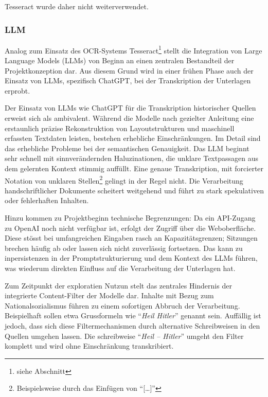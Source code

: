 \documentclass[12pt, a4paper, ngerman, bidi=default]{article}
\begin{document}
Tesseract wurde daher nicht weiterverwendet.

\subsubsection{LLM}\label{subsubsec:LLM_transcript}
Analog zum Einsatz des OCR-Systems Tesseract\footnote{siehe Abschnitt } stellt die Integration von Large Language Models (LLMs) von Beginn an einen zentralen Bestandteil der Projektkonzeption dar.
Aus diesem Grund wird in einer frühen Phase auch der Einsatz von LLMs, spezifisch ChatGPT, bei der Transkription der Unterlagen erprobt.

Der Einsatz von LLMs wie ChatGPT für die Transkription historischer Quellen erweist sich als ambivalent. Während die Modelle nach gezielter 
Anleitung eine erstaunlich präzise Rekonstruktion von Layoutstrukturen und maschinell erfassten Textdaten leisten, bestehen erhebliche Einschränkungen. Im Detail sind das
erhebliche Probleme bei der semantischen Genauigkeit. Das LLM beginnt sehr schnell mit sinnverändernden Haluzinationen, die unklare Textpassagen aus dem gelernten Kontext stimmig auffüllt.
Eine genaue Transkription, mit forcierter Notation von unklaren Stellen\footnote{Beispielsweise durch das Einfügen von \enquote{[\dots]}} gelingt in der Regel nicht. 
Die Verarbeitung handschriftlicher Dokumente scheitert weitgehend und führt zu stark spekulativen oder fehlerhaften Inhalten.

Hinzu kommen zu Projektbeginn technische Begrenzungen: Da ein API-Zugang zu OpenAI noch nicht verfügbar ist, erfolgt der Zugriff 
über die Weboberfläche. Diese stösst bei umfangreichen Eingaben rasch an Kapazitätsgrenzen; 
Sitzungen brechen häufig ab oder lassen sich nicht zuverlässig fortsetzen. Das kann zu inpersistenzen in der Promptstrukturierung und
dem Kontext des LLMs führen, was wiederum direkten Einfluss auf die Verarbeitung der Unterlagen hat.

Zum Zeitpunkt der exploratien Nutzun stelt das zentrales Hindernis der integrierte Content-Filter der Modelle dar. Inhalte mit Bezug zum Nationalsozialismus
führen zu einem sofortigen Abbruch der Verarbeitung. Beispielhaft sollen etwa Grussformeln wie \enquote{\textit{Heil Hitler}} genannt sein. Auffällig ist jedoch, dass
sich diese Filtermechanismen durch alternative Schreibweisen in den Quellen umgehen lassen. Die schreibweise \enquote{\textit{Heil -- Hitler}} umgeht den Filter komplett 
und wird ohne Einschränkung transkribiert.
\end{document}
